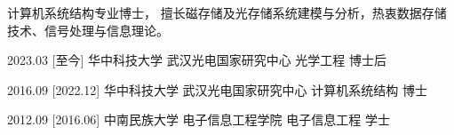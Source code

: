 \documentclass[zh]{resume}
\begin{document}
\makeheader
{\onehalfspacing\hspace{2em}%
计算机系统结构专业博士，
擅长磁存储及光存储系统建模与分析，热衷数据存储技术、信号处理与信息理论。
\par}


\begin{educations}
  \education%
    {2023.03}%
    [至今]%
    {华中科技大学}%
    {武汉光电国家研究中心}%
    {光学工程}%
    {博士后}

  \separator{0.5ex}
  \education%
    {2016.09}%
    [2022.12]%
    {华中科技大学}%
    {武汉光电国家研究中心}%
    {计算机系统结构}%
    {博士}

  \separator{0.5ex}
  \education%
    {2012.09}%
    [2016.06]%
    {中南民族大学}%
    {电子信息工程学院}%
    {电子信息工程}%
    {学士}
\end{educations}

\end{document}

